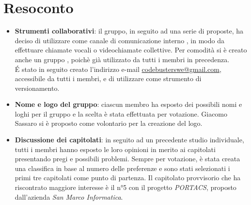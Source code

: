 \section{Resoconto}
\begin{itemize}
\item \textbf{Strumenti collaborativi}: il gruppo, in seguito ad una serie di proposte, ha deciso di utilizzare come canale di comunicazione interno , in modo da effettuare chiamate vocali o videochiamate collettive. Per comodità si è creato anche un gruppo , poichè già utilizzato da tutti i membri in precedenza.\\ \'E stato in seguito creato l'indirizzo e-mail \href{mailto:codebusterswe@gmail.com}{\color{cyan}codebusterswe@gmail.com}, accessibile da tutti i membri, e di utilizzare  come strumento di versionamento.

\item \textbf{Nome e logo del gruppo}: ciascun membro ha esposto dei possibili nomi e loghi per il gruppo e la scelta è stata effettuata per votazione. Giacomo Sassaro si è proposto come volontario per la creazione del logo.

\item \textbf{Discussione dei capitolati}: in seguito ad un precedente studio individuale, tutti i membri hanno esposto le loro opinioni in merito ai capitolati presentando pregi e possibili problemi. Sempre per votazione, è stata creata una classifica in base al numero delle preferenze e sono stati selezionati i primi tre capitolati come punto di partenza. Il capitolato provvisorio che ha riscontrato maggiore interesse è il n°5 con il progetto \textit{PORTACS}, proposto dall'azienda \textit{San Marco Informatica}.
\end{itemize}